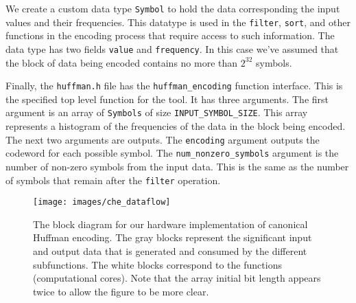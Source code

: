 We create a custom data type \lstinline{Symbol} to hold the data corresponding the input values and their frequencies. This datatype is used in the \lstinline{filter}, \lstinline{sort}, and other functions in the encoding process that require access to such information. The data type has two fields \lstinline{value} and \lstinline{frequency}.  In this case we've assumed that the block of data being encoded contains no more than $2^{32}$ symbols.

Finally, the \lstinline{huffman.h} file has the \lstinline{huffman_encoding} function interface. This is the specified top level function for the \VHLS tool. It has three arguments. The first argument is an array of \lstinline{Symbols} of size \lstinline{INPUT_SYMBOL_SIZE}.  This array represents a histogram of the frequencies of the data in the block being encoded. The next two arguments are outputs. The \lstinline{encoding} argument outputs the codeword for each possible symbol. The \lstinline{num_nonzero_symbols} argument is the number of non-zero symbols from the input data. This is the same as the number of symbols that remain after the \lstinline{filter} operation. 

\begin{figure}
\centering
\texttt{[image: images/che\_dataflow]}
\caption{ The block diagram for our hardware implementation of canonical Huffman encoding. The gray blocks represent the significant input and output data that is generated and consumed by the different subfunctions. The white blocks correspond to the functions (computational cores). Note that the array initial bit length appears twice to allow the figure to be more clear.}
\label{fig:che_dataflow}
\end{figure}

